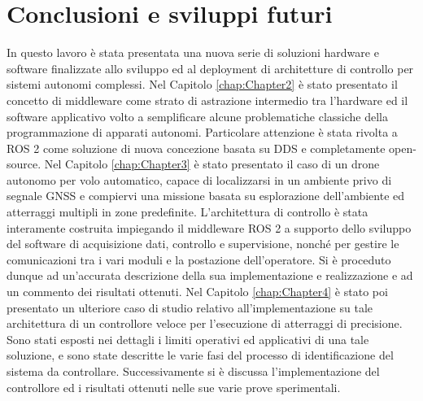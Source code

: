 
\chapter[Conclusioni e sviluppi futuri]{Conclusioni e sviluppi futuri}
\label{chap:Chapter5} 
\doublespacing
\fontsize{12}{12}\selectfont
\indent In questo lavoro è stata presentata una nuova serie di soluzioni hardware e software finalizzate allo sviluppo ed al deployment di architetture di controllo per sistemi autonomi complessi. Nel Capitolo \ref{chap:Chapter2} è stato presentato il concetto di middleware come strato di astrazione intermedio tra l'hardware ed il software applicativo volto a semplificare alcune problematiche classiche della programmazione di apparati autonomi. Particolare attenzione è stata rivolta a ROS 2 come soluzione di nuova concezione basata su DDS e completamente open-source. Nel Capitolo \ref{chap:Chapter3} è stato presentato il caso di un drone autonomo per volo automatico, capace di localizzarsi in un ambiente privo di segnale GNSS e compiervi una missione basata su esplorazione dell'ambiente ed atterraggi multipli in zone predefinite. L'architettura di controllo è stata interamente costruita impiegando il middleware ROS 2 a supporto dello sviluppo del software di acquisizione dati, controllo e supervisione, nonché per gestire le comunicazioni tra i vari moduli e la postazione dell'operatore. Si è proceduto dunque ad un'accurata descrizione della sua implementazione e realizzazione e ad un commento dei risultati ottenuti. Nel Capitolo \ref{chap:Chapter4} è stato poi presentato un ulteriore caso di studio relativo all'implementazione su tale architettura di un controllore veloce per l'esecuzione di atterraggi di precisione. Sono stati esposti nei dettagli i limiti operativi ed applicativi di una tale soluzione, e sono state descritte le varie fasi del processo di identificazione del sistema da controllare. Successivamente si è discussa l'implementazione del controllore ed i risultati ottenuti nelle sue varie prove sperimentali.

